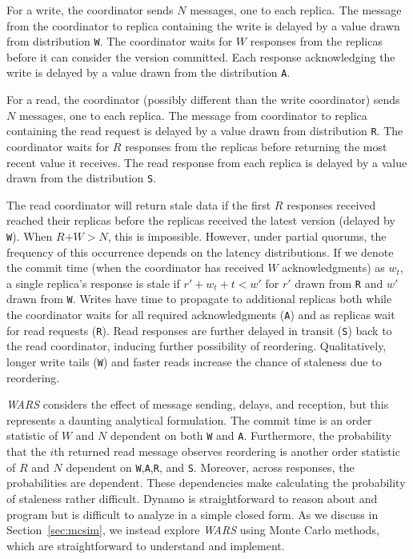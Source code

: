 \documentclass{vldb}
\begin{document}
For a write, the coordinator sends $N$ messages, one to each
replica. The message from the coordinator to replica containing the
write is delayed by a value drawn from distribution \texttt{W}.  The
coordinator waits for $W$ responses from the replicas before it can
consider the version committed.  Each response acknowledging the write
is delayed by a value drawn from the distribution \texttt{A}.

For a read, the coordinator (possibly different than the write
coordinator) sends $N$ messages, one to each replica.  The message
from coordinator to replica containing the read request is delayed by
a value drawn from distribution \texttt{R}.  The coordinator waits
for $R$ responses from the replicas before returning the most recent
value it receives.  The read response from each replica is delayed by
a value drawn from the distribution \texttt{S}.

The read coordinator will return stale data if the first $R$ responses
received reached their replicas before the replicas
received the latest version (delayed by \texttt{W}).  When
$R$$+$$W$$>$$N$, this is impossible.  However, under partial quorums,
the frequency of this occurrence depends on the latency distributions.
If we denote the commit time (when the coordinator has received $W$
acknowledgments) as $w_t$, a single replica's response is stale if
$r'+w_t+t< w'$ for $r'$ drawn from \texttt{R} and $w'$ drawn from
\texttt{W}.  Writes have time to propagate to additional replicas both
while the coordinator waits for all required acknowledgments
(\texttt{A}) and as replicas wait for read requests (\texttt{R}).  Read
responses are further delayed in transit (\texttt{S}) back to the read
coordinator, inducing further possibility of reordering.
Qualitatively, longer write tails (\texttt{W}) and faster reads
increase the chance of staleness due to reordering.

\textit{WARS} considers the effect of message sending, delays, and
reception, but this represents a daunting analytical formulation.  The
commit time is an order statistic of $W$ and $N$ dependent on both
\texttt{W} and \texttt{A}.  Furthermore, the probability that the
$i$th returned read message observes reordering is another order
statistic of $R$ and $N$ dependent on
\texttt{W},\texttt{A},\texttt{R}, and \texttt{S}.  Moreover, across
responses, the probabilities are dependent. These dependencies make
calculating the probability of staleness rather difficult.  Dynamo is
straightforward to reason about and program but is difficult to
analyze in a simple closed form.  As we discuss in
Section~\ref{sec:mcsim}, we instead explore \textit{WARS} using Monte
Carlo methods, which are straightforward to understand and implement.
\end{document}
